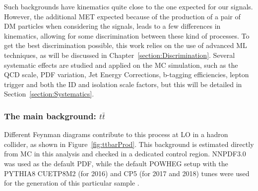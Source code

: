 \documentclass[a4paper, 10pt, openright]{report}
\begin{document}
Such backgrounds have kinematics quite close to the one expected for our signals. However, the additional \ac{MET} expected because of the production of a pair of \ac{DM} particles when considering the signals, leads to a few differences in kinematics, allowing for some discrimination between these kind of processes. To get the best discrimination possible, this work relies on the use of advanced \acf{ML} techniques, as will be discussed in Chapter~\ref{section:Discrimination}. Several systematic effects are studied and applied on the \ac{MC} simulation, such as the QCD scale, PDF variation, Jet Energy Corrections, b-tagging efficiencies, lepton trigger and both the ID and isolation scale factors, but this will be detailed in Section~\ref{section:Systematics}.

\subsubsection{The main background: $t \bar t$} \label{subsection:ttbar}


Different Feynman diagrams contribute to this process at \ac{LO} in a hadron collider, as shown in Figure~\ref{fig:ttbarProd}. This background is estimated directly from \ac{MC} in this analysis and checked in a dedicated control region. NNPDF3.0 \cite{NNPDF} was used as the default \ac{PDF}, while the default POWHEG setup with the PYTHIA8 CUETP8M2 (for 2016) and CP5 (for 2017 and 2018) tunes were used for the generation of this particular sample \cite{PythiaTunes}.
\end{document}
